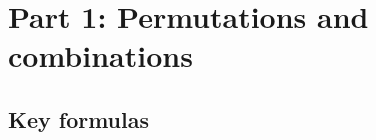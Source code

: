 
\maketitle


\tableofcontents
\clearpage

\section{Part 1: Permutations and combinations}

\subsection*{Key formulas}


